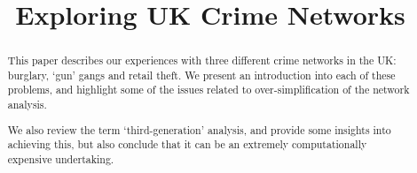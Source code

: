 \documentclass[conference]{IEEEtran}
\theoremstyle{definition}
\begin{document}
%
\title{Exploring UK Crime Networks}

\author{
\and
{}
}





\maketitle


\begin{abstract}
This paper describes our experiences with three different crime
networks in the UK: burglary, `gun' gangs and retail theft. We present
an introduction into each of these problems, and highlight some of the
issues related to over-simplification of the network analysis.

We also review the term `third-generation' analysis, and provide some
insights into achieving this, but also conclude that it can be an
extremely computationally expensive undertaking.
\end{abstract}

%
\IEEEpeerreviewmaketitle
\end{document}
